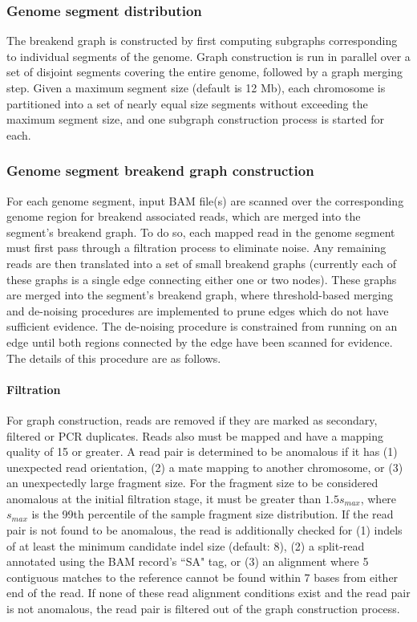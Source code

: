 \documentclass{article}
\begin{document}
\subsubsection{Genome segment distribution}

The breakend graph is constructed by first computing subgraphs corresponding to individual segments of the genome. Graph construction is run in parallel over a set of disjoint segments covering the entire genome, followed by a graph merging step. Given a maximum segment size (default is 12 Mb), each chromosome is partitioned into a set of nearly equal size segments without exceeding the maximum segment size, and one subgraph construction process is started for each.

\subsubsection{Genome segment breakend graph construction}

For each genome segment, input BAM file(s) are scanned over the corresponding genome region for breakend associated reads, which are merged into the segment's breakend graph. To do so, each mapped read in the genome segment must first pass through a filtration process to eliminate noise. Any remaining reads are then translated into a set of small breakend graphs (currently each of these graphs is a single edge connecting either one or two nodes). These graphs are merged into the segment's breakend graph, where threshold-based merging and de-noising procedures are implemented to prune edges which do not have sufficient evidence. The de-noising procedure is constrained from running on an edge until both regions connected by the edge have been scanned for evidence. The details of this procedure are as follows.

\paragraph{Filtration}
For graph construction, reads are removed if they are marked as secondary, filtered or PCR duplicates. Reads also must be mapped and have a mapping quality of 15 or greater. A read pair is determined to be anomalous if it has (1) unexpected read orientation, (2) a mate mapping to another chromosome, or (3) an unexpectedly large fragment size. For the fragment size to be considered anomalous at the initial filtration stage, it must be greater than $1.5s_{max}$, where $s_{max}$ is the 99th percentile of the sample fragment size distribution. If the read pair is not found to be anomalous, the read is additionally checked for (1) indels of at least the minimum candidate indel size (default: 8), (2) a split-read annotated using the BAM record's ``SA" tag, or (3) an alignment where 5 contiguous matches to the reference cannot be found within 7 bases from either end of the read. If none of these read alignment conditions exist and the read pair is not anomalous, the read pair is filtered out of the graph construction process. 
\end{document}
